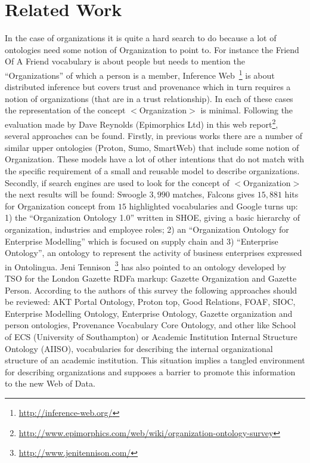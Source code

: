 \documentclass{llncs}
\begin{document}
\section{Related Work}
 
In the case of organizations it is quite a hard search to do because a lot of ontologies need some notion of 
Organization to point to. For instance the Friend Of A Friend vocabulary is about people 
but needs to mention the ``Organizations'' of which a person is a member, 
Inference Web~\footnote{\url{http://inference-web.org/}} is about distributed inference but covers trust and provenance 
which in turn requires a notion of organizations (that are in a trust relationship). In each of these cases 
the representation of the concept $<$Organization$>$ is minimal.  Following the evaluation made by 
Dave Reynolds (Epimorphics Ltd) in this web report\footnote{\url{http://www.epimorphics.com/web/wiki/organization-ontology-survey}}, 
several approaches can be found. Firstly, in previous works there are a number of similar upper ontologies 
(Proton, Sumo, SmartWeb) that include some notion of Organization. These models have a lot of other intentions that 
do not match with the specific requirement of a small and reusable model to describe organizations. 
Secondly, if search engines are used to look for the concept of $<$Organization$>$ the next results will 
be found: Swoogle $3,990$ matches, Falcons gives $15,881$ hits for Organization concept from $15$ highlighted vocabularies 
and Google turns up: 1) the ``Organization Ontology 1.0'' written in SHOE,  giving a basic hierarchy of 
organization, industries and employee roles; 2) an ``Organization Ontology for Enterprise Modelling'' 
which is focused on supply chain and 3) ``Enterprise Ontology'', an ontology to represent the activity of
business enterprises expressed in Ontolingua. Jeni Tennison~\footnote{\url{http://www.jenitennison.com/}} has also pointed 
to an ontology developed by TSO for the London Gazette RDFa markup: Gazette Organization and Gazette Person. 
According to the authors of this survey the following approaches should be reviewed: AKT Portal Ontology, 
Proton top, Good Relations, FOAF, SIOC, Enterprise Modelling Ontology, Enterprise Ontology, Gazette organization and 
person ontologies, Provenance Vocabulary Core Ontology, and other like School of ECS (University of Southampton) or 
Academic Institution Internal Structure Ontology (AIISO), vocabularies for describing the internal organizational 
structure of an academic institution. This situation implies a tangled environment for describing organizations and supposes
a barrier to promote this information to the new Web of Data.
\end{document}

